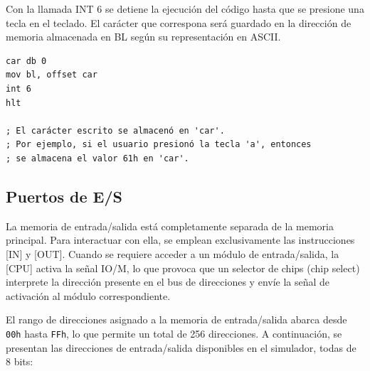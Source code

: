\documentclass[12pt,oneside]{templates/unerthesis}
\begin{document}
Con la llamada INT 6 se detiene la ejecución del código hasta que se presione una tecla en el teclado. El carácter que correspona será guardado en la dirección de memoria almacenada en BL según su representación en ASCII.

\begin{lstlisting}
car db 0
mov bl, offset car
int 6
hlt

; El carácter escrito se almacenó en 'car'.
; Por ejemplo, si el usuario presionó la tecla 'a', entonces
; se almacena el valor 61h en 'car'.\end{lstlisting}

\hypertarget{puertos-de-es}{%
\subsection{Puertos de E/S}\label{puertos-de-es}}

La memoria de entrada/salida está completamente separada de la memoria principal. Para interactuar con ella, se emplean exclusivamente las instrucciones {[}IN{]} y {[}OUT{]}. Cuando se requiere acceder a un módulo de entrada/salida, la {[}CPU{]} activa la señal IO/M, lo que provoca que un selector de chips (chip select) interprete la dirección presente en el bus de direcciones y envíe la señal de activación al módulo correspondiente.

El rango de direcciones asignado a la memoria de entrada/salida abarca desde \texttt{00h} hasta \texttt{FFh}, lo que permite un total de 256 direcciones. A continuación, se presentan las direcciones de entrada/salida disponibles en el simulador, todas de 8 bits:
\end{document}
